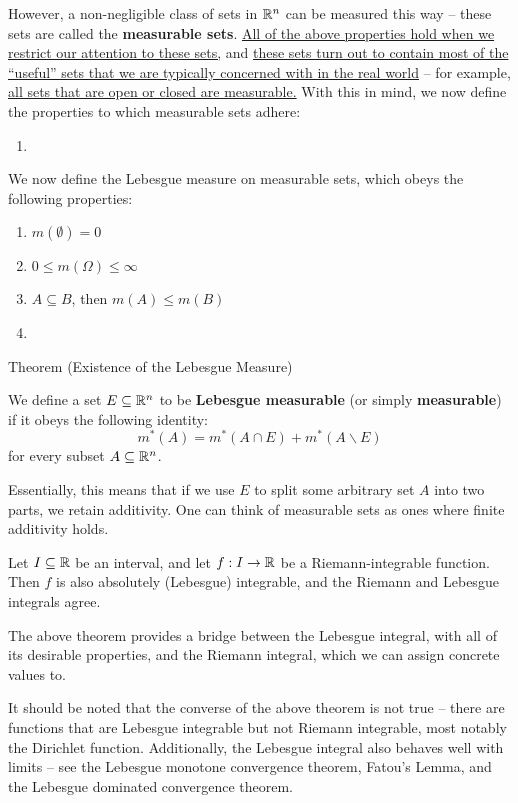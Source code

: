 However, a non-negligible class of sets in $\mathbb{R}^n$ can be measured this way -- these sets are called the \textbf{measurable sets}. \uline{All of the above properties hold when we restrict our attention to these sets,} and \uline{these sets turn out to contain most of the ``useful'' sets that we are typically concerned with in the real world} -- for example, \uline{all sets that are open or closed are measurable.} With this in mind, we now define the properties to which measurable sets adhere: \begin{enumerate}
    \item
\end{enumerate}

We now define the Lebesgue measure on measurable sets, which obeys the following properties: \begin{enumerate}
    \item $m(\emptyset) = 0$
    \item $0 \leq m(\Omega) \leq \infty$
    \item $A \subseteq B$, then $m(A) \leq m(B)$
    \item
\end{enumerate}

Theorem (Existence of the Lebesgue Measure)

 We define a set $E \subseteq \mathbb{R}^n$ to be \textbf{Lebesgue measurable} (or simply \textbf{measurable}) if it obeys the following identity: $$m^*(A) = m^*(A \cap E) + m^*(A \backslash E)$$ for every subset $A \subseteq \mathbb{R}^n$.

Essentially, this means that if we use $E$ to split some arbitrary set $A$ into two parts, we retain additivity. One can think of measurable sets as ones where finite additivity holds.

 Let $I \subseteq \mathbb{R}$ be an interval, and let $f : I \to \mathbb{R}$ be a Riemann-integrable function. Then $f$ is also absolutely (Lebesgue) integrable, and the Riemann and Lebesgue integrals agree.

The above theorem provides a bridge between the Lebesgue integral, with all of its desirable properties, and the Riemann integral, which we can assign concrete values to.

It should be noted that the converse of the above theorem is not true -- there are functions that are Lebesgue integrable but not Riemann integrable, most notably the Dirichlet function. Additionally, the Lebesgue integral also behaves well with limits -- see the Lebesgue monotone convergence theorem, Fatou's Lemma, and the Lebesgue dominated convergence theorem.

